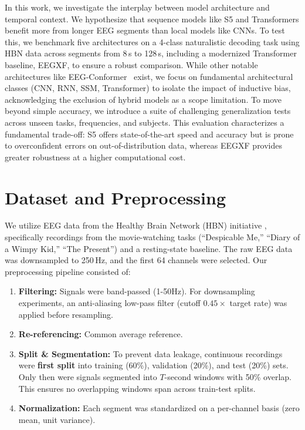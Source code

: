 \documentclass{article}
\newcommand{\eegtrans}{EEGXF}
\begin{document}
In this work, we investigate the interplay between model architecture and temporal context. We hypothesize that sequence models like S5 and Transformers benefit more from longer EEG segments than local models like CNNs. To test this, we benchmark five architectures on a 4-class naturalistic decoding task using HBN data across segments from 8\,s to 128\,s, including a modernized Transformer baseline, \eegtrans{}, to ensure a robust comparison. While other notable architectures like EEG-Conformer~\cite{song2023eeg} exist, we focus on fundamental architectural classes (CNN, RNN, SSM, Transformer) to isolate the impact of inductive bias, acknowledging the exclusion of hybrid models as a scope limitation. To move beyond simple accuracy, we introduce a suite of challenging generalization tests across unseen tasks, frequencies, and subjects. This evaluation characterizes a fundamental trade-off: S5 offers state-of-the-art speed and accuracy but is prone to overconfident errors on out-of-distribution data, whereas \eegtrans{} provides greater robustness at a higher computational cost.

\section{Dataset and Preprocessing}
\label{sec:data}

We utilize EEG data from the Healthy Brain Network (HBN) initiative \cite{shirazi2024hbn}, specifically recordings from the movie-watching tasks (``Despicable Me,'' ``Diary of a Wimpy Kid,'' ``The Present'') and a resting-state baseline.
The raw EEG data was downsampled to 250\,Hz, and the first 64 channels were selected. Our preprocessing pipeline consisted of:
\begin{enumerate}[label=\arabic*., leftmargin=*]
    \item \textbf{Filtering:} Signals were band-passed (1-50Hz). For downsampling experiments, an anti-aliasing low-pass filter (cutoff $0.45 \times$ target rate) was applied before resampling.
    \item \textbf{Re-referencing:} Common average reference.
    \item \textbf{Split \& Segmentation:} To prevent data leakage, continuous recordings were \textbf{first split} into training (60\%), validation (20\%), and test (20\%) sets. Only then were signals segmented into $T$-second windows with 50\% overlap. This ensures no overlapping windows span across train-test splits.
    \item \textbf{Normalization:} Each segment was standardized on a per-channel basis (zero mean, unit variance).
\end{enumerate}
\end{document}
